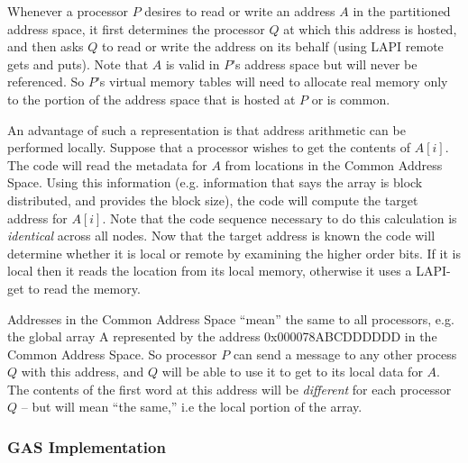Whenever a processor $P$ desires to read or write an address  $A$ in the 
partitioned address space, it first determines the processor $Q$ at which 
this address is hosted, and then asks $Q$ to read or write the address on 
its behalf (using LAPI remote gets and puts). Note that  $A$ is valid in 
$P$'s address space but will never be referenced. So $P$'s virtual memory 
tables will need to allocate real memory only to the portion of the 
address space that is hosted at $P$ or is common.

An advantage of such a representation is that address arithmetic can be 
performed locally. Suppose that a processor wishes to get the contents 
of $A[i]$. The code will read the metadata for $A$ from locations in the  
Common Address Space. Using this information (e.g.{} information that says 
the array is block distributed, and provides the block size), the code 
will compute the target address for $A[i]$. Note that the code sequence 
necessary to do this calculation is {\em identical} across all nodes. Now 
that the target address is known the code will determine whether it is 
local or remote by examining the higher order bits. If it is local then 
it reads the location from its local memory, otherwise it uses a 
LAPI-get to read the memory.


Addresses in the Common Address Space ``mean'' the same to all
processors, e.g. the global array A represented by the address
0x000078ABCDDDDDD in the Common Address Space. So processor $P$ can send
a message to any other process $Q$ with this address, and $Q$ will be
able to use it to get to its local data for $A$. The contents of the
first word at this address will be {\em different} for each processor
$Q$ -- but will mean ``the same,'' i.e the local portion of the array.

\subsubsection {GAS Implementation}

